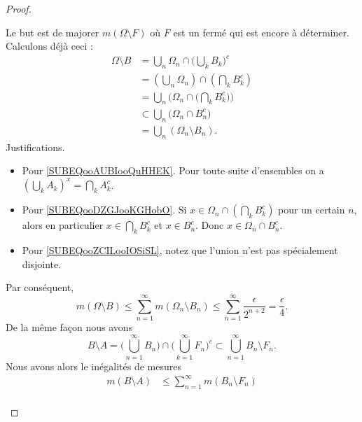 \begin{proof}
\begin{subproof}
\begin{subproof}
			Le but est de majorer \( m(\Omega\setminus F)\) où \( F\) est un fermé qui est encore à déterminer. Calculons déjà ceci :
			\begin{subequations}
				\begin{align}
					\Omega\setminus B & =\bigcup_n\Omega_n\cap\big( \bigcup_kB_k \big)^c                                            \\
					                  & =\left( \bigcup_n\Omega_n \right)\cap\left( \bigcap_kB_k^c \right)                          \\
					                  & =\bigcup_n\Big( \Omega_n\cap\big( \bigcap_kB_k^c \big) \Big)    \label{SUBEQooAUBIooQuHHEK} \\
					                  & \subset\bigcup_n\big( \Omega_n\cap B_n^c \big)           \label{SUBEQooDZGJooKGHobO}        \\
					                  & =\bigcup_n(\Omega_n\setminus B_n)       \label{SUBEQooZCILooIOSiSL}.
				\end{align}
			\end{subequations}
			Justifications.
			\begin{itemize}
				\item Pour \eqref{SUBEQooAUBIooQuHHEK}. Pour toute suite d'ensembles on a \( \left( \bigcup_kA_k \right)^x=\bigcap_kA_k^c\).
				\item Pour \eqref{SUBEQooDZGJooKGHobO}. Si \( x\in \Omega_n\cap\left( \bigcap_kB_k^c \right)\) pour un certain \( n\), alors en particulier \( x\in \bigcap_kB_k^c\) et \( x\in B_n^c\). Donc \( x\in \Omega_n\cap B_n^c\).
				\item Pour \eqref{SUBEQooZCILooIOSiSL}, notez que l'union n'est pas spécialement disjointe.
			\end{itemize}
			Par conséquent,
			\begin{equation}
				m(\Omega\setminus B)\leq \sum_{n=1}^{\infty}m(\Omega_n\setminus B_n)\leq \sum_{n=1}^{\infty}\frac{ \epsilon }{ 2^{n+2} }=\frac{ \epsilon }{ 4 }.
			\end{equation}
			De la même façon nous avons
			\begin{equation}
				B\setminus A=\big( \bigcup_{n=1}^{\infty}B_n \big)\cap\big( \bigcup_{k=1}^{\infty}F_n \big)^c\subset \bigcup_{n=1}^{\infty}B_n\setminus F_n.
			\end{equation}
			Nous avons alors le inégalités de mesures
			\begin{subequations}
				\begin{align}
					m(B\setminus A) & \leq \sum_{n=1}^{\infty}m(B_n\setminus F_n)      \\

\end{align}
\end{subequations}
\end{subproof}
\end{subproof}
\end{proof}
